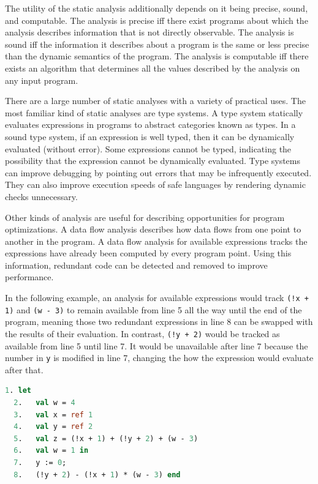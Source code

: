 \documentclass{article}
\begin{document}
The utility of the static analysis additionally depends on it being precise, sound, and
computable. The analysis is precise iff there exist programs about which the analysis
describes information that is not directly observable. The analysis is sound iff the
information it describes about a program is the same or less precise than the dynamic
semantics of the program. The analysis is computable iff there exists an algorithm that
determines all the values described by the analysis on any input program.

There are a large number of static analyses with a variety of practical uses. The most familiar
kind of static analyses are type systems.  A type system statically evaluates expressions
in programs to abstract categories known as types. In a sound type system, if an expression is
well typed, then it can be dynamically evaluated (without error). Some expressions cannot be
typed, indicating the possibility that the expression cannot be dynamically evaluated. Type
systems can improve debugging by pointing out errors that may be infrequently executed. They
can also improve execution speeds of safe languages by rendering dynamic checks unnecessary.  

Other kinds of analysis are useful for describing opportunities for program optimizations.
A data flow analysis describes how data flows from one point to another in the program.
A data flow analysis for available expressions tracks the expressions have already been
computed by every program point. Using this information, redundant code can be detected and
removed to improve performance.

In the following example, an analysis for available expressions would track
\lstinline{(!x + 1)} and \lstinline{(w - 3)} to remain available from line 5 all the way until
the end of the program, meaning those two redundant expressions in line 8 can be swapped with
the results of their evaluation. In contrast, \lstinline{(!y + 2)} would be tracked as available
from line 5 until line 7. It would be unavailable after line 7 because the number in
\lstinline{y} is modified in line 7, changing the how the expression would evaluate after
that.

\begin{lstlisting}[language=ML, escapechar=\%]
  1. let
  2.   val w = 4
  3.   val x = ref 1
  4.   val y = ref 2
  5.   val z = (!x + 1) + (!y + 2) + (w - 3)
  6.   val w = 1 in
  7.   y := 0;
  8.   (!y + 2) - (!x + 1) * (w - 3) end
  \end{lstlisting}
\end{document}
